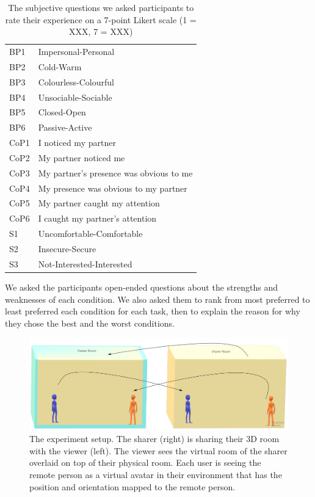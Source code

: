 \begin{table}
    \centering
    \begin{tabular}{ll}
BP1 &    Impersonal-Personal\\
BP2 &    Cold-Warm\\
BP3 &    Colourless-Colourful\\
BP4 &    Unsociable-Sociable\\
BP5 &    Closed-Open\\
BP6 &    Passive-Active\\
CoP1    &   I noticed my partner\\
CoP2    &   My partner noticed me\\
CoP3    &   My partner's presence was obvious to me\\
CoP4    &   My presence was obvious to my partner\\
CoP5    &   My partner caught my attention \\
CoP6    &   I caught my partner's attention\\
S1  & Uncomfortable-Comfortable\\
S2  & Insecure-Secure\\
S3  & Not-Interested-Interested\\
    \end{tabular}
    \caption{The subjective questions we asked participants to rate their experience on a 7-point Likert scale (1 = XXX, 7 = XXX)}
    \label{tab:frontier18:questions}
\end{table}

We asked the participants open-ended questions about the strengths and weaknesses of each condition. We also asked them to rank from most preferred to least preferred each condition for each task, then to explain the reason for why they chose the best and the worst conditions. 

\begin{figure}
\begin{center}
\includegraphics[width=\linewidth]{images/frontier18/experiment-setup.jpg}
\caption{The experiment setup. The sharer (right) is sharing their 3D room with the viewer (left). The viewer sees the virtual room of the sharer overlaid on top of their physical room. Each user is seeing the remote person as a virtual avatar in their environment that has the position and orientation mapped to the remote person.}\label{fig:frontier18:setup}
\end{center}
\end{figure}

